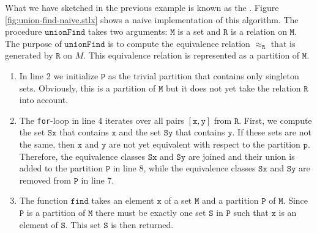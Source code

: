 What we have sketched in the previous example is known as the .
Figure \ref{fig:union-find-naive.stlx} shows a naive implementation of this algorithm.  The
procedure $\texttt{unionFind}$ takes two arguments: $\texttt{M}$ is a set and $\texttt{R}$ is a relation
on $\texttt{M}$.  The purpose of $\texttt{unionFind}$ is to compute the equivalence relation $\approx_\texttt{R}$
that is generated by $\texttt{R}$ on $M$.  This equivalence relation is represented as a partition of $\texttt{M}$.
\begin{enumerate}
\item In line 2 we initialize $\texttt{P}$ as the trivial partition that contains only singleton
      sets.  Obviously, this is a partition of $\texttt{M}$ but it does not yet take the
      relation $\texttt{R}$ into account.
\item The \texttt{for}-loop in line 4 iterates over all pairs $[\texttt{x},\texttt{y}]$ from $\texttt{R}$.
      First, we compute the set $\texttt{Sx}$ that contains $\texttt{x}$ and the set $\texttt{Sy}$ that
      contains $\texttt{y}$.  If these sets are not the same, then $\texttt{x}$ and $\texttt{y}$ are not
      yet equivalent with respect to the partition $\texttt{p}$.  Therefore, the equivalence classes
      $\texttt{Sx}$ and $\texttt{Sy}$ are joined and their union is added to the partition 
      $\texttt{P}$ in line 8, while the equivalence classes $\texttt{Sx}$ and $\texttt{Sy}$ are
      removed from $\texttt{P}$ in line 7.
\item The function $\texttt{find}$ takes an element $\texttt{x}$ of a set $\texttt{M}$ and a partition
      $\texttt{P}$ of $\texttt{M}$.  Since $\texttt{P}$ is a partition of $\texttt{M}$ there must be exactly
      one set $\texttt{S}$ in $\texttt{P}$ such that $\texttt{x}$ is an element of $\texttt{S}$.  This set
      $\texttt{S}$ is then returned.
\end{enumerate}

